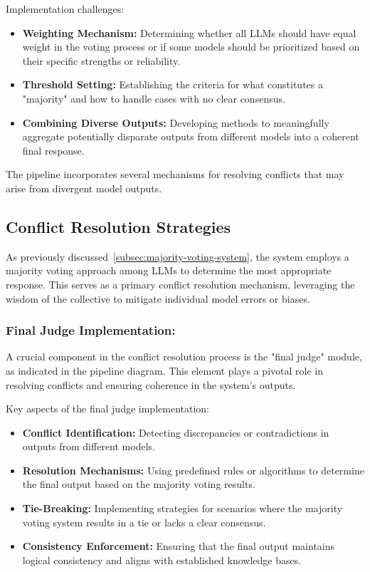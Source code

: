 Implementation challenges:
\begin{itemize}
    \item \textbf{Weighting Mechanism:} Determining whether all LLMs should have equal weight in the voting process or if some models should be prioritized based on their specific strengths or reliability.
    \item \textbf{Threshold Setting:} Establishing the criteria for what constitutes a "majority" and how to handle cases with no clear consensus.
    \item \textbf{Combining Diverse Outputs:} Developing methods to meaningfully aggregate potentially disparate outputs from different models into a coherent final response.
\end{itemize}
The pipeline incorporates several mechanisms for resolving conflicts that may arise from divergent model outputs.

\subsection{Conflict Resolution Strategies}\label{subsec:conflict-resolution-strategies}
As previously discussed~\ref{subsec:majority-voting-system}, the system employs a majority voting approach among LLMs to determine the most appropriate response.
This serves as a primary conflict resolution mechanism, leveraging the wisdom of the collective to mitigate individual model errors or biases.
\subsubsection{Final Judge Implementation:}
A crucial component in the conflict resolution process is the "final judge" module, as indicated in the pipeline diagram.
This element plays a pivotal role in resolving conflicts and ensuring coherence in the system's outputs.

Key aspects of the final judge implementation:
\begin{itemize}
    \item \textbf{Conflict Identification:} Detecting discrepancies or contradictions in outputs from different models.
    \item \textbf{Resolution Mechanisms:} Using predefined rules or algorithms to determine the final output based on the majority voting results.
    \item \textbf{Tie-Breaking:} Implementing strategies for scenarios where the majority voting system results in a tie or lacks a clear consensus.
    \item \textbf{Consistency Enforcement:} Ensuring that the final output maintains logical consistency and aligns with established knowledge bases.
\end{itemize}

